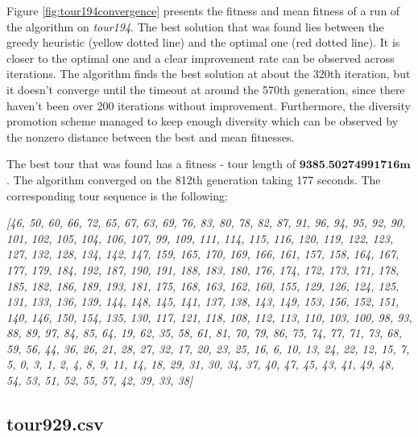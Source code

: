 \documentclass[a4paper,10pt]{article}
\newcommand{\ReplaceMe}[1]{{\color{blue}#1}}
\begin{document}
Figure \ref{fig:tour194convergence} presents the fitness and mean fitness of a run of the algorithm on \textit{tour194}. The best solution that was found lies between the greedy heuristic (yellow dotted line) and the optimal one (red dotted line). It is closer to the optimal one and a clear improvement rate can be observed across iterations. The algorithm finds the best solution at about the 320th iteration, but it doesn't converge until the timeout at around the 570th generation, since there haven't been over 200 iterations without improvement. Furthermore, the diversity promotion scheme managed to keep enough diversity which can be observed by the nonzero distance between the best and mean fitnesses.

The best tour that was found has a fitness - tour length of $\textbf{9385.50274991716m}$. The algorithm converged on the 812th generation taking 177 seconds. The corresponding tour sequence is the following:

\begin{center}
\textit{[46, 50, 60, 66, 72, 65, 67, 63, 69, 76, 83, 80, 78, 82, 87, 91, 96, 94, 95, 92, 90, 101, 102, 105, 104, 106, 107, 99, 109, 111, 114, 115, 116, 120, 119, 122, 123, 127, 132, 128, 134, 142, 147, 159, 165, 170, 169, 166, 161, 157, 158, 164, 167, 177, 179, 184, 192, 187, 190, 191, 188, 183, 180, 176, 174, 172, 173, 171, 178, 185, 182, 186, 189, 193, 181, 175, 168, 163, 162, 160, 155, 129, 126, 124, 125, 131, 133, 136, 139, 144, 148, 145, 141, 137, 138, 143, 149, 153, 156, 152, 151, 140, 146, 150, 154, 135, 130, 117, 121, 118, 108, 112, 113, 110, 103, 100, 98, 93, 88, 89, 97, 84, 85, 64, 19, 62, 35, 58, 61, 81, 70, 79, 86, 75, 74, 77, 71, 73, 68, 59, 56, 44, 36, 26, 21, 28, 27, 32, 17, 20, 23, 25, 16, 6, 10, 13, 24, 22, 12, 15, 7, 5, 0, 3, 1, 2, 4, 8, 9, 11, 14, 18, 29, 31, 30, 34, 37, 40, 47, 45, 43, 41, 49, 48, 54, 53, 51, 52, 55, 57, 42, 39, 33, 38]}
\end{center}

\subsection{tour929.csv} \label{ss:tour929}

%
%
%
\end{document}
